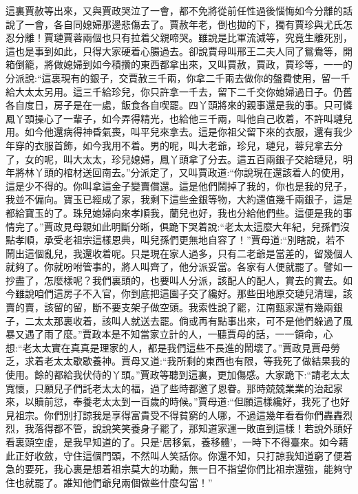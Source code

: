 \begin{parag}
    這裏賈赦等出來，又與賈政哭泣了一會，都不免將從前任性過後惱悔如今分離的話說了一會，各自同媳婦那邊悲傷去了。賈赦年老，倒也拋的下，獨有賈珍與尤氏怎忍分離！賈璉賈蓉兩個也只有拉着父親啼哭。雖說是比軍流減等，究竟生離死別，這也是事到如此，只得大家硬着心腸過去。卻說賈母叫邢王二夫人同了鴛鴦等，開箱倒籠，將做媳婦到如今積攢的東西都拿出來，又叫賈赦，賈政，賈珍等，一一的分派說:“這裏現有的銀子，交賈赦三千兩，你拿二千兩去做你的盤費使用，留一千給大太太另用。這三千給珍兒，你只許拿一千去，留下二千交你媳婦過日子。仍舊各自度日，房子是在一處，飯食各自喫罷。四丫頭將來的親事還是我的事。只可憐鳳丫頭操心了一輩子，如今弄得精光，也給他三千兩，叫他自己收着，不許叫璉兒用。如今他還病得神昏氣喪，叫平兒來拿去。這是你祖父留下來的衣服，還有我少年穿的衣服首飾，如今我用不着。男的呢，叫大老爺，珍兒，璉兒，蓉兒拿去分了，女的呢，叫大太太，珍兒媳婦，鳳丫頭拿了分去。這五百兩銀子交給璉兒，明年將林丫頭的棺材送回南去。”分派定了，又叫賈政道:“你說現在還該着人的使用，這是少不得的。你叫拿這金子變賣償還。這是他們鬧掉了我的，你也是我的兒子，我並不偏向。寶玉已經成了家，我剩下這些金銀等物，大約還值幾千兩銀子，這是都給寶玉的了。珠兒媳婦向來孝順我，蘭兒也好，我也分給他們些。這便是我的事情完了。”賈政見母親如此明斷分晰，俱跪下哭着說:“老太太這麼大年紀，兒孫們沒點孝順，承受老祖宗這樣恩典，叫兒孫們更無地自容了！”賈母道:“別瞎說，若不鬧出這個亂兒，我還收着呢。只是現在家人過多，只有二老爺是當差的，留幾個人就夠了。你就吩咐管事的，將人叫齊了，他分派妥當。各家有人便就罷了。譬如一抄盡了，怎麼樣呢？我們裏頭的，也要叫人分派，該配人的配人，賞去的賞去。如今雖說咱們這房子不入官，你到底把這園子交了纔好。那些田地原交璉兒清理，該賣的賣，該留的留，斷不要支架子做空頭。我索性說了罷，江南甄家還有幾兩銀子，二太太那裏收着，該叫人就送去罷。倘或再有點事出來，可不是他們躲過了風暴又遇了雨了麼。”賈政本是不知當家立計的人，一聽賈母的話，一一領命，心想:“老太太實在真真是理家的人，都是我們這些不長進的鬧壞了。”賈政見賈母勞乏，求着老太太歇歇養神。賈母又道:“我所剩的東西也有限，等我死了做結果我的使用。餘的都給我伏侍的丫頭。”賈政等聽到這裏，更加傷感。大家跪下:“請老太太寬懷，只願兒子們託老太太的福，過了些時都邀了恩眷。那時兢兢業業的治起家來，以贖前愆，奉養老太太到一百歲的時候。”賈母道:“但願這樣纔好，我死了也好見祖宗。你們別打諒我是享得富貴受不得貧窮的人哪，不過這幾年看看你們轟轟烈烈，我落得都不管，說說笑笑養身子罷了，那知道家運一敗直到這樣！若說外頭好看裏頭空虛，是我早知道的了。只是‘居移氣，養移體’，一時下不得臺來。如今藉此正好收斂，守住這個門頭，不然叫人笑話你。你還不知，只打諒我知道窮了便着急的要死，我心裏是想着祖宗莫大的功勳，無一日不指望你們比祖宗還強，能夠守住也就罷了。誰知他們爺兒兩個做些什麼勾當！”
\end{parag}


